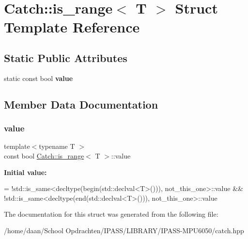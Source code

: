 \hypertarget{structCatch_1_1is__range}{}\section{Catch\+:\+:is\+\_\+range$<$ T $>$ Struct Template Reference}
\label{structCatch_1_1is__range}
\subsection*{Static Public Attributes}
\begin{DoxyCompactItemize}
\item 
static const bool {\bfseries value}
\end{DoxyCompactItemize}


\subsection{Member Data Documentation}
\mbox{\label{structCatch_1_1is__range_afaec39e819c3956829cbbd00feba11be}} 
\subsubsection{\texorpdfstring{value}{value}}
{\footnotesize\ttfamily template$<$typename T $>$ \\
const bool \hyperlink{structCatch_1_1is__range}{Catch\+::is\+\_\+range}$<$ T $>$\+::value\hspace{0.3cm}{\ttfamily [static]}}

{\bfseries Initial value\+:}
\begin{DoxyCode}
=
            !std::is\_same<decltype(begin(std::declval<T>())), not\_this\_one>::value &&
            !std::is\_same<decltype(end(std::declval<T>())), not\_this\_one>::value
\end{DoxyCode}


The documentation for this struct was generated from the following file\+:\begin{DoxyCompactItemize}
\item 
/home/daan/\+School Opdrachten/\+I\+P\+A\+S\+S/\+L\+I\+B\+R\+A\+R\+Y/\+I\+P\+A\+S\+S-\/\+M\+P\+U6050/catch.\+hpp\end{DoxyCompactItemize}
